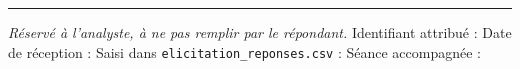 \documentclass[11pt,a4paper]{article}
\begin{document}
\vspace{0.7cm}
\noindent\rule{\linewidth}{0.4pt}

\vspace{0.2cm}
\footnotesize\emph{Réservé à l'analyste, à ne pas remplir par le répondant.} Identifiant
attribué : \underline{\hspace{2.4cm}} \quad Date de réception : \underline{\hspace{2.4cm}}
\quad Saisi dans \texttt{elicitation\_reponses.csv} : \framebox[0.34cm]{\rule{0pt}{0.26cm}}
\quad Séance accompagnée : \framebox[0.34cm]{\rule{0pt}{0.26cm}}
\normalsize
\end{document}
